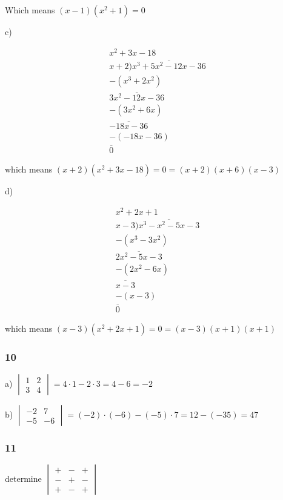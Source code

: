 \documentclass[]{report}
\begin{document}
Which means $(x-1)(x^2 + 1) = 0$

c)

\begin{align*}
x^2 + 3x - 18\\
x + 2) \overline{x^3 + 5x^2  - 12x -36}\\
- (x^3 +2x^2)\\
\overline{3x^2 - 12x -36}\\
-(3x^2 + 6x)\\
\overline{-18x - 36}\\
-(-18x - 36) \\
\overline{0}
\end{align*}

which means $(x+2)(x^2 + 3x - 18) = 0 = (x+2)(x+6)(x-3)$

d)

\begin{align*}
x^2 + 2x +  1\\
x-3) \overline{x^3 - x^2 - 5x - 3}\\
- (x^3 -3x^2)\\
\overline{2x^2 - 5x - 3}\\
- (2x^2 - 6x)\\
\overline{x - 3}\\
- (x - 3)\\
\overline{0}
\end{align*}

which means $(x-3)(x^2 + 2x + 1) = 0 = (x-3)(x+1)(x+1)$

\subsubsection{10}
a) 
$
\begin{vmatrix}
	1 & 2\\
	3 & 4
\end{vmatrix} = 4\cdot1 - 2\cdot3 = 4 -6 = -2
$

b) 
$
\begin{vmatrix}
-2 & 7 \\
-5 & -6
\end{vmatrix} = (-2) \cdot (-6) - (-5)\cdot 7 = 12 - (-35) = 47
$

\subsubsection{11}
determine
$
\begin{vmatrix}
+ & - & + \\
- & + & - \\
+ & - & +
\end{vmatrix}
$
\end{document}
